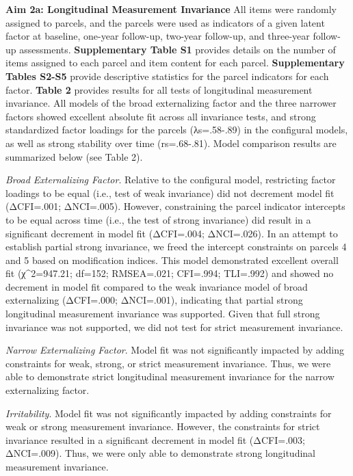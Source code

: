 \documentclass[
  20pt,
  number,
  preprint,
  3p,
  twocolumn]{elsarticle}
\begin{document}
\textbf{Aim 2a: Longitudinal Measurement Invariance} All items were
randomly assigned to parcels, and the parcels were used as indicators of
a given latent factor at baseline, one-year follow-up, two-year
follow-up, and three-year follow-up assessments. \textbf{Supplementary
Table S1} provides details on the number of items assigned to each
parcel and item content for each parcel. \textbf{Supplementary Tables
S2-S5} provide descriptive statistics for the parcel indicators for each
factor. \textbf{Table 2} provides results for all tests of longitudinal
measurement invariance. All models of the broad externalizing factor and
the three narrower factors showed excellent absolute fit across all
invariance tests, and strong standardized factor loadings for the
parcels (λs=.58-.89) in the configural models, as well as strong
stability over time (rs=.68-.81). Model comparison results are
summarized below (see Table 2).

\emph{Broad Externalizing Factor}. Relative to the configural model,
restricting factor loadings to be equal (i.e., test of weak invariance)
did not decrement model fit (ΔCFI=.001; ΔNCI=.005). However,
constraining the parcel indicator intercepts to be equal across time
(i.e., the test of strong invariance) did result in a significant
decrement in model fit (ΔCFI=.004; ΔNCI=.026). In an attempt to
establish partial strong invariance, we freed the intercept constraints
on parcels 4 and 5 based on modification indices. This model
demonstrated excellent overall fit (χ\^{}2=947.21; df=152; RMSEA=.021;
CFI=.994; TLI=.992) and showed no decrement in model fit compared to the
weak invariance model of broad externalizing (ΔCFI=.000; ΔNCI=.001),
indicating that partial strong longitudinal measurement invariance was
supported. Given that full strong invariance was not supported, we did
not test for strict measurement invariance.

\emph{Narrow Externalizing Factor}. Model fit was not significantly
impacted by adding constraints for weak, strong, or strict measurement
invariance. Thus, we were able to demonstrate strict longitudinal
measurement invariance for the narrow externalizing factor.

\emph{Irritability}. Model fit was not significantly impacted by adding
constraints for weak or strong measurement invariance. However, the
constraints for strict invariance resulted in a significant decrement in
model fit (ΔCFI=.003; ΔNCI=.009). Thus, we were only able to demonstrate
strong longitudinal measurement invariance.
\end{document}
